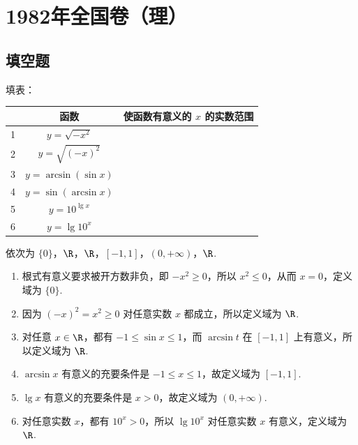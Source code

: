 \documentclass[UTF8,a4paper,oneside,11pt]{ctexbook}
\begin{document}
\mainmatter

\chapter{1982年全国卷（理）}

\section{填空题}

\begin{problem}

填表：

\begin{center}
\renewcommand{\arraystretch}{1.2}
\setlength{\tabcolsep}{6pt}
\begin{tabular}{|c|c|c|}
\hline
 & 函数 & 使函数有意义的 \(x\) 的实数范围 \\
\hline
1 & \(y=\sqrt{-x^2}\) &\fillinblank{} \\
\hline
2 & \(y=\sqrt{(-x)^2}\) &\fillinblank{} \\
\hline
3 & \(y=\arcsin(\sin x)\) &\fillinblank{} \\
\hline
4 & \(y=\sin(\arcsin x)\) &\fillinblank{} \\
\hline
5 & \(y=10^{\lg x}\) &\fillinblank{} \\
\hline
6 & \(y=\lg 10^x\) &\fillinblank{} \\
\hline
\end{tabular}
\end{center}
\end{problem}

\begin{answer}
依次为 \(\{0\}\)，\(\R\)，\(\R\)，\([-1,1]\)，\((0,+\infty)\)，\(\R\).
\end{answer}

\begin{solution}
\begin{enumerate}
\item 根式有意义要求被开方数非负，即 \(-x^2\geqslant0\)，所以 \(x^2\leqslant0\)，从而 \(x=0\)，定义域为 \(\{0\}\).
\item 因为 \((-x)^2=x^2\geqslant0\) 对任意实数 \(x\) 都成立，所以定义域为 \(\R\).
\item 对任意 \(x\in\R\)，都有 \(-1\leqslant\sin x\leqslant1\)，而 \(\arcsin t\) 在 \([-1,1]\) 上有意义，所以定义域为 \(\R\).
\item \(\arcsin x\) 有意义的充要条件是 \(-1\leqslant x\leqslant1\)，故定义域为 \([-1,1]\).
\item \(\lg x\) 有意义的充要条件是 \(x>0\)，故定义域为 \((0,+\infty)\).
\item 对任意实数 \(x\)，都有 \(10^x>0\)，所以 \(\lg 10^x\) 对任意实数 \(x\) 有意义，定义域为 \(\R\).
\end{enumerate}
\end{solution}
\end{document}
